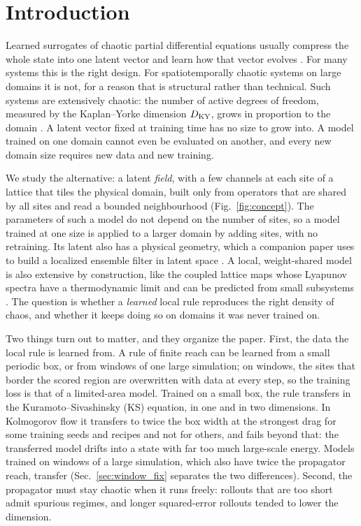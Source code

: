 \section{Introduction}
\label{sec:introduction}

Learned surrogates of chaotic partial differential equations usually
compress the whole state into one latent vector and learn how that
vector evolves \citep{linotgraham2022,racca2023,ozalpmagri2025}. For
many systems this is the right design. For spatiotemporally chaotic
systems on large domains it is not, for a reason that is structural
rather than technical. Such systems are extensively chaotic: the number
of active degrees of freedom, measured by the Kaplan--Yorke dimension
$D_{\mathrm{KY}}$, grows in proportion to the domain
\citep{ruelle1982,manneville1985,egolfgreenside1994}. A latent vector
fixed at training time has no size to grow into. A model trained on one
domain cannot even be evaluated on another, and every new domain size
requires new data and new training.

We study the alternative: a latent \emph{field}, with a few channels at
each site of a lattice that tiles the physical domain, built only from
operators that are shared by all sites and read a bounded neighbourhood
(Fig.~\ref{fig:concept}).
The parameters of such a model do not depend on the number of sites, so
a model trained at one size is applied to a larger domain by adding
sites, with no retraining. Its latent also has a physical geometry, which
a companion paper uses to build a localized ensemble filter in latent space
\citep{jones2026da}. A local, weight-shared model is
also extensive by construction, like the coupled lattice maps whose
Lyapunov spectra have a thermodynamic limit \citep{livi1986,isola1990}
and can be predicted from small subsystems \citep{carretero1999}. The
question is whether a \emph{learned} local rule reproduces the right
density of chaos, and whether it keeps doing so on domains it was never
trained on.

Two things turn out to matter, and they organize the paper. First, the
data the local rule is learned from. A rule of finite reach can be
learned from a small periodic box, or from windows of one large
simulation; on windows, the sites that border the scored region are
overwritten with data at every step, so the training loss is that of a
limited-area model. Trained on a small box, the rule
transfers in the Kuramoto--Sivashinsky (KS) equation, in
one and in two dimensions. In Kolmogorov flow it transfers to twice the
box width at the strongest drag for some training seeds and recipes and
not for others, and fails beyond that: the transferred model drifts into
a state with far too much large-scale energy. Models trained on windows
of a large simulation, which also have twice the propagator reach,
transfer (Sec.~\ref{sec:window_fix} separates the two differences).
Second, the propagator must stay chaotic when it runs freely: rollouts
that are too short admit spurious regimes, and longer squared-error
rollouts tended to lower the dimension.

